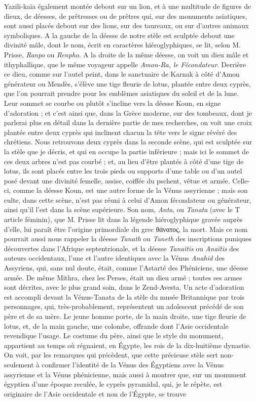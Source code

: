 \documentclass[a4paper, 11pt, oneside, polutonikogreek, french]{article}
\begin{document}
Yazili-kaïa également montée debout sur un lion, et à une multitude de figures de dieux, de déesses, de prêtresses ou de prêtres qui, sur des monuments asiatiques, sont aussi placés debout sur des lions, sur des taureaux, ou sur d'autres animaux symboliques. A la gauche de la déesse de notre stèle est sculptée debout une divinité mâle, dont le nom, écrit en caractères hiéroglyphiques, se lit, selon M. Prisse, \emph{Ranpo} ou \emph{Renpho}. A la droite de la même déesse, on voit un dieu mâle et ithyphallique, que le même voyageur appelle \emph{Amon-Ra, le Fécondateur}. Derrière ce dieu, comme sur l'autel peint, dans le sanctuaire de Karnak à côté d'Amon générateur ou Mendès, s'élève une tige fleurie de lotus, plantée entre deux cyprès, que l'on pourrait prendre pour les emblèmes asiatiques du soleil et de la lune. Leur sommet se courbe ou plutôt s'incline vers la déesse Koun, en signe d'adoration ; et c'est ainsi que, dans la Grèce moderne, sur des tombeaux, dont je parlerai plus en détail dans la dernière partie de mes recherches, on voit une croix plantée entre deux cyprès qui inclinent chacun la tête vers le signe révéré des chrétiens. Nous retrouvons deux cyprès dans la seconde scène, qui est sculptée sur la stèle que je décris, et qui en occupe la partie inférieure ; mais ici le sommet de ces deux arbres n'est pas courbé ; et, au lieu d'être plantés à côté d'une tige de lotus, ils sont placés entre les trois pieds ou supports d'une table ou d'un autel posé devant une divinité femelle, assise, coiffée du pschent, vêtue et armée. Celle-ci, comme la déesse Koun, est une autre forme de la Vénus assyrienne ; mais son culte, dans cette scène, n'est pas réuni à celui d'Amon fécondateur ou générateur, ainsi qu'il l'est dans la scène supérieure. Son nom, \emph{Anta}, ou \emph{Tanata} (avec le T article féminin), que M. Prisse lit dans la légende hiéroglyphique gravée auprès d'elle, lui paraît être l'origine primordiale du grec θάνατος, la mort. Mais ce nom pourrait aussi nous rappeler la déesse \emph{Tanath} ou \emph{Taneth} des inscriptions puniques découvertes dans l'Afrique septentrionale, et la déesse \emph{Tanaïtis} ou \emph{Anaïtis} des auteurs occidentaux, l'une et l'autre identiques avec la Vénus \emph{Anahid} des Assyriens, qui, sans nul doute, était, comme l'Astarté des Phéniciens, une déesse armée. De même Mithra, chez les Perses, était un dieu armé ; toutes ses armes sont décrites, avec le plus grand soin, dans le Zend-Avesta. Un acte d'adoration est accompli devant la Vénus-Tanata de la stèle du musée Britannique par trois personnages, qui, très-probablement, représentent un adolescent précédé de son père et de sa mère. Le jeune homme porte, de la main droite, une tige fleurie de lotus, et, de la main gauche, une colombe, offrande dont l'Asie occidentale revendique l'usage. Le costume du père, ainsi que le style du monument, appartient au temps où régnaient, en Égypte, les rois de la dix-huitième dynastie. On voit, par les remarques qui précèdent, que cette précieuse stèle sert non-seulement à confirmer l'identité de la Vénus des Égyptiens avec la Vénus assyrienne et la Vénus phénicienne, mais aussi à montrer que, sur un monument égyptien d'une époque reculée, le cyprès pyramidal, qui, je le répète, est originaire de l'Asie occidentale et non de l'Égypte, se trouve 
\end{document}
